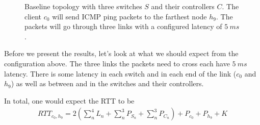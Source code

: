 \begin{figure}
  \centering
  \caption{Baseline topology with three switches $S$ and their controllers
    $C$.  The client $c_0$ will send ICMP ping packets to the farthest node
      $h_9$.  The packets will go through three links with a configured
      latency of $5~ms$.}
  \label{figure:baseline.topology}
\end{figure}

Before we present the results, let's look at what we should expect from the
configuration above.  The three links the packets need to cross each have
$5~ms$ latency.  There is some latency in each switch and in each end of the
link ($c_0$ and $h_9$) as well as between and in the switches and their
controllers.

In total, one would expect the \acf{RTT} to be
\begin{gather}
  RTT_{c_0, h_9} = 2\left( \sum_n^4 L_n + \sum_n^3 P_{S_n} + \sum_n^3 P_{C_n} \right) + P_{c_0} + P_{h_9} + K
  \label{equation:baseline.rtt}
\end{gather}

